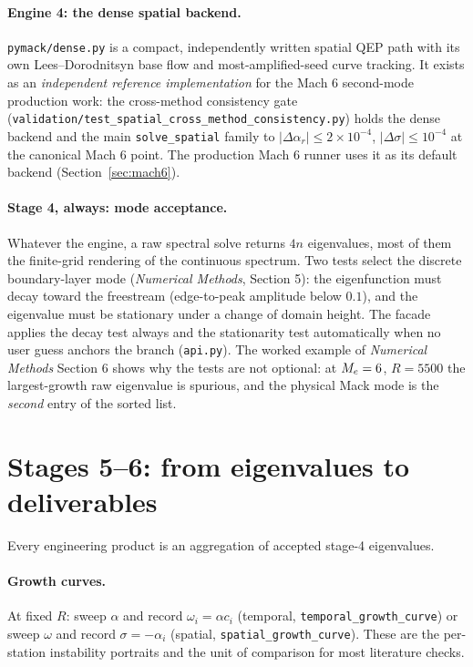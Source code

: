 \documentclass[11pt]{article}
\begin{document}
\paragraph{Engine 4: the dense spatial backend.} \texttt{pymack/dense.py} is a compact,
independently written spatial QEP path with its own Lees--Dorodnitsyn base flow and
most-amplified-seed curve tracking. It exists as an \emph{independent reference implementation}
for the Mach 6 second-mode production work: the cross-method consistency gate
(\texttt{validation/test\_spatial\_cross\_method\_consistency.py}) holds the dense backend and
the main \texttt{solve\_spatial} family to $|\Delta\alpha_r|\le2\times10^{-4}$,
$|\Delta\sigma|\le10^{-4}$ at the canonical Mach 6 point. The production Mach 6 runner uses it
as its default backend (Section~\ref{sec:mach6}).

\paragraph{Stage 4, always: mode acceptance.} Whatever the engine, a raw spectral solve returns
$4n$ eigenvalues, most of them the finite-grid rendering of the continuous spectrum. Two tests
select the discrete boundary-layer mode (\emph{Numerical Methods}, Section 5): the eigenfunction
must decay toward the freestream (edge-to-peak amplitude below $0.1$), and the
eigenvalue must be stationary under a change of domain height. The facade applies the decay test
always and the stationarity test automatically when no user guess anchors the branch
(\texttt{api.py}). The worked example of \emph{Numerical Methods} Section 6 shows why the tests
are not optional: at $M_e=6$, $R=5500$ the largest-growth raw eigenvalue is spurious, and the
physical Mack mode is the \emph{second} entry of the sorted list.

\section{Stages 5--6: from eigenvalues to deliverables}\label{sec:deliverables}
Every engineering product is an aggregation of accepted stage-4 eigenvalues.

\paragraph{Growth curves.} At fixed $R$: sweep $\alpha$ and record $\omega_i=\alpha c_i$
(temporal, \texttt{temporal\_growth\_curve}) or sweep $\omega$ and record $\sigma=-\alpha_i$
(spatial, \texttt{spatial\_growth\_curve}). These are the per-station instability portraits and
the unit of comparison for most literature checks.
\end{document}

